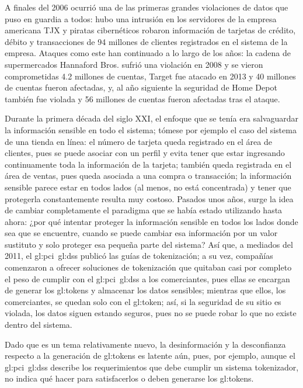 A finales del 2006 ocurrió una de las primeras grandes violaciones de datos
que puso en guardia a todos: hubo una intrusión en los servidores de la empresa
americana TJX y piratas cibernéticos robaron información de tarjetas de crédito,
débito y transacciones de 94 millones de clientes registrados en el sistema de
la empresa. Ataques como este han continuado a lo largo de los años: la cadena
de supermercados Hannaford Bros. sufrió una violación en 2008 y se vieron
comprometidas 4.2 millones de cuentas, Target fue atacado en 2013 y 40 millones
de cuentas fueron afectadas, y, al año siguiente la seguridad de Home Depot
también fue violada y 56 millones de cuentas fueron afectadas tras el ataque.

Durante la primera década del siglo XXI, el enfoque que se tenía era
salvaguardar la información sensible en todo el sistema; tómese por ejemplo el
caso del sistema de una tienda en línea: el número de tarjeta queda registrado
en el área de clientes, pues se puede asociar con un perfil y evita tener que
estar ingresando continuamente toda la información de la tarjeta; también queda
registrada en el área de ventas, pues queda asociada a una compra o transacción;
la información sensible parece estar en todos lados (al menos, no está
concentrada) y tener que protegerla constantemente resulta muy costoso. Pasados
unos años, surge la idea de cambiar completamente el paradigma que se había
estado utilizando hasta ahora: ¿por qué intentar proteger la información
sensible en todos los lados donde sea que se encuentre, cuando se puede cambiar
esa información por un valor sustituto y solo proteger esa pequeña parte del
sistema? Así que, a mediados del 2011, el \gls{gl:pci}~\gls{gl:dss} publicó
las guías de tokenización; a su vez, compañías comenzaron a ofrecer soluciones
de tokenización que quitaban casi por completo el peso de cumplir con el
\gls{gl:pci}~\gls{gl:dss} a los comerciantes, pues ellas se encargan de generar
los \glspl{gl:token} y almacenar los datos sensibles; mientras que ellos,
los comerciantes, se quedan solo con el \gls{gl:token}; así, si la seguridad de
su sitio es violada, los datos siguen estando seguros, pues no se puede robar
lo que no existe dentro del sistema.

Dado que es un tema relativamente nuevo, la desinformación y la desconfianza
respecto a la generación de \glspl{gl:token} es latente aún, pues, por ejemplo,
aunque el \gls{gl:pci}~\gls{gl:dss} describe los requerimientos que debe cumplir
un sistema tokenizador, no indica qué hacer para satisfacerlos o deben generarse
los \glspl{gl:token}.

